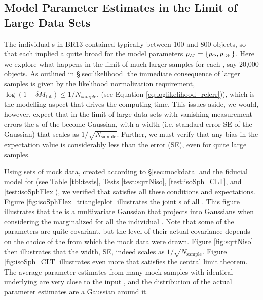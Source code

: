 \subsection{Model Parameter Estimates in the Limit of Large Data Sets} \label{sec:largedata}

The individual \MAP{}s in BR13 contained typically between 100 and 800 objects, so that each \MAP{} implied a quite broad \pdf{} for the model parameters $p_M{}=\{p_\Phi,p_\text{DF}\}$. Here we explore what happens in the limit of much larger samples for each \MAP{}, say 20,000 objects. As outlined in \S\ref{sec:likelihood} the immediate consequence of larger samples is given by the likelihood normalization requirement, $\log(1+\delta M_\text{tot})\le 1/N_{sample}$, (see Equation \ref{eq:loglikelihood_relerr})), which is the modelling aspect that drives the computing time. This issues aside, we would, however, expect that in the limit of large data sets with vanishing measurement errors the \pdf{}s of the \pmodel{} become Gaussian, with a \pdf{} width (i.e. standard error SE of the Gaussian) that scales as $1/\sqrt{N_\text{sample}}$. Further, we must verify that any bias in the \pdf{} expectation value is considerably less than the error (SE), even for quite large samples.

Using sets of mock data, created according to \S\ref{sec:mockdata} and the fiducial model for \pmodel{} (see Table \ref{tbl:tests}, Tests \ref{test:sqrtNiso}, \ref{test:isoSph_CLT}, and \ref{test:isoSphFlex}), we verified that \RM{} satisfies all these conditions and expectations. Figure \ref{fig:isoSphFlex_triangleplot} illustrates the joint \pdf{}s of all \pmodel{}. This figure illustrates that the \pdf{} is a multivariate Gaussian that projects into Gaussians when considering the marginalized \pdf{} for all the individual \pmodel{}. Note that some of the parameters are quite covariant, but the level of their actual covariance depends on the choice of the \pmodel{} from which the mock data were drawn. Figure \ref{fig:sqrtNiso} then illustrates that the \pdf{} width, SE, indeed scales as $1/\sqrt{N_\text{sample}}$. Figure \ref{fig:isoSph_CLT} illustrates even more that \RM{} satisfies the central limit theorem. The average parameter estimates from many mock samples with identical underlying \pmodel{} are very close to the input \pmodel{}, and the distribution of the actual parameter estimates are a Gaussian around it. 


